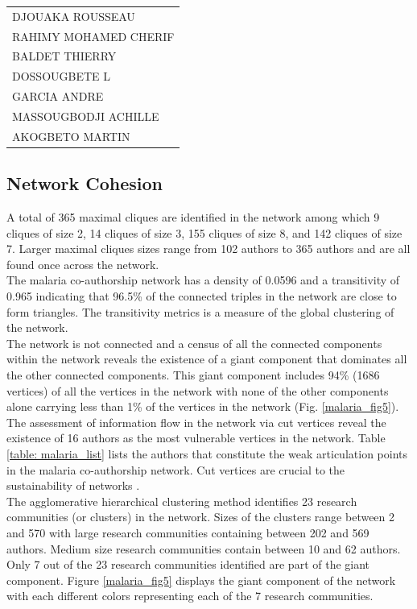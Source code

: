 \begin{table}[!ht]
\begin{tabular}{l}
\hspace{20pt}DJOUAKA ROUSSEAU\\
\hspace{20pt}RAHIMY MOHAMED CHERIF\\
\hspace{20pt}BALDET THIERRY\\
\hspace{20pt}DOSSOUGBETE L\\
\hspace{20pt}GARCIA ANDRE\\
\hspace{20pt}MASSOUGBODJI ACHILLE\\
\hspace{20pt}AKOGBETO MARTIN\\
\bottomrule
\end{tabular}
\end{table}

\subsection{Network Cohesion}
A total of 365 maximal cliques are identified in the network among which 9 cliques of size 2, 14 cliques of size 3, 155 cliques of size 8, and 142 cliques of size 7. Larger maximal cliques sizes range from 102 authors to 365 authors and are all found once across the network. \\The malaria co-authorship network has a density of 0.0596 and a transitivity of 0.965 indicating that 96.5\% of the connected triples in the network are close to form triangles. The transitivity metrics is a measure of the global clustering of the network.\\The network is not connected and a census of all the connected components within the network reveals the existence of a giant component that dominates all the other connected components. This giant component includes 94\% (1686 vertices) of all the vertices in the network with none of the other components alone carrying less than 1\% of the vertices in the network (Fig. \ref{malaria_fig5}).  \\The assessment of information flow in the network via cut vertices reveal the existence of 16 authors as the most vulnerable vertices in the network. Table \ref{table: malaria_list} lists the authors that constitute the weak articulation points in the malaria co-authorship network. Cut vertices are crucial to the sustainability of networks \cite{kolaczyk_statistical_2014}.\\
The agglomerative hierarchical clustering method identifies 23 research communities (or clusters) in the network. Sizes of the clusters range between 2 and 570 with large research communities containing between 202 and 569 authors. Medium size research communities contain between 10 and 62 authors. Only 7 out of the 23 research communities identified are part of the giant component. Figure \ref{malaria_fig5} displays the giant component of the network with each different colors representing each of the 7 research communities.

